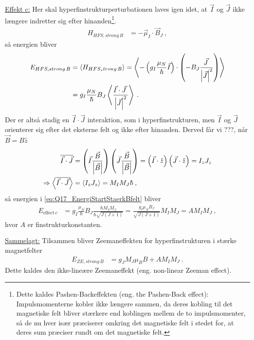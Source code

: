 \noindent\underline{Effekt c:} Her skal hyperfinstrukturperturbationen laves igen idet, at $\Vec{I}$ og $\Vec{J}$ ikke længere indretter sig efter hinanden\footnote{Dette kaldes Pashen-Backeffekten (eng. the Pashen-Back effect): Impulsmomenterne kobler ikke længere sammen, da deres kobling til det magnetiske felt bliver stærkere end koblingen mellem de to impulsmomenter, så de nu hver især præciserer omkring det magnetiske felt i stedet for, at deres sum præciser rundt om det magnetiske felt.}.
\begin{align}
    H_{HFS,strong\,B} &= - \Vec{\mu}_I \cdot \Vec{B}_J \: ,
\end{align}
så energien bliver
\begin{align} \label{eq:Q17_EnergiStartStaerkBfelt}
    E_{HFS,strong\,B} &= \Braket{H_{HFS_strong\,B}} = \Braket{- \left(g_I \frac{\mu_N}{\hbar}\Vec{I}\right) \cdot \left(- B_J\frac{\Vec{J} \:}{\abs{\Vec{J}}^2}\right)} \nonumber\\
    &= g_I \frac{\mu_N}{\hbar}B_J \Braket{\frac{\Vec{I} \cdot \Vec{J} \:}{\abs{\Vec{J}}^2}} \: .
\end{align}
Der er altså stadig en $\Vec{I} \cdot \Vec{J}$ interaktion, som i hyperfinstrukturen, men $\Vec{I}$ og $\Vec{J}$ orienterer sig efter det eksterne felt og ikke efter hinanden. Derved får vi ???, når $\Vec{B} = B \hat{z}$
\begin{align}
    \overline{\Vec{I} \cdot \Vec{J}} &= \left(\Vec{I}\frac{\Vec{B}}{\abs{\Vec{B}}}\right)\left(\Vec{J}\frac{\Vec{B}}{\abs{\Vec{B}}}\right) = \left(\Vec{I} \cdot \hat{z}\right)\left(\Vec{J} \cdot \hat{z}\right) = I_z J_z \\
    \Rightarrow \Braket{\overline{\Vec{I} \cdot \Vec{J}}} &= \Braket{I_z J_z} = M_I M_J \hbar \: ,
\end{align}
så energien i \cref{eq:Q17_EnergiStartStaerkBfelt} bliver
\begin{align} \label{eq:Q17_EnergyFromEffectC}
    E_{\text{effect}\,c} &= g_I \frac{\mu_N}{\hbar}B_J \frac{\hbar M_I M_J}{\hbar \sqrt{J(J+1)}} = \frac{g_I \mu_N B_J}{\sqrt{J(J+1)}} M_I M_J = A M_I M_J \: ,
\end{align}
hvor $A$ er finstrukturkonstanten.

\noindent\underline{Sammelagt:} Tilsammen bliver Zeemaneffekten for hyperfinstrukturen i stærke magnetfelter
\begin{align} \label{eq:EnergiskiftZeemanIHyperfinstrukturStarktFelt}
    E_{ZE,strong\,B} &= g_J M_J \mu_B B + A M_I M_J \: .
\end{align}
Dette kaldes den \textsf{ikke-lineære Zeemaneffekt} (eng. non-linear Zeeman effect).


